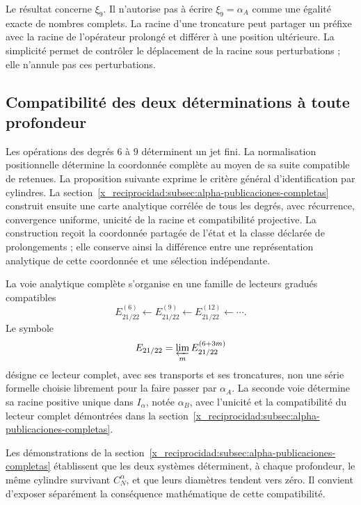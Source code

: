 Le résultat concerne \(\xi_9\). Il n'autorise pas à écrire \(\xi_9=\alpha_A\) comme une égalité exacte de nombres complets. La racine d'une troncature peut partager un préfixe avec la racine de l'opérateur prolongé et différer à une position ultérieure. La simplicité permet de contrôler le déplacement de la racine sous perturbations ; elle n'annule pas ces perturbations.

\subsection{Compatibilité des deux déterminations à toute profondeur}
\label{x_reciprocidad:subsec:alpha-limite-dos-vias}

\begin{remark}
Les opérations des degrés \(6\) à \(9\) déterminent un jet fini. La normalisation positionnelle détermine la coordonnée complète au moyen de sa suite compatible de retenues. La proposition suivante exprime le critère général d'identification par cylindres. La section~\ref{x_reciprocidad:subsec:alpha-publicaciones-completas} construit ensuite une carte analytique corrélée de tous les degrés, avec récurrence, convergence uniforme, unicité de la racine et compatibilité projective. La construction reçoit la coordonnée partagée de l'état et la classe déclarée de prolongements ; elle conserve ainsi la différence entre une représentation analytique de cette coordonnée et une sélection indépendante.
\end{remark}

La voie analytique complète s’organise en une famille de lecteurs
gradués compatibles
\[
 E_{21/22}^{(6)}\longleftarrow E_{21/22}^{(9)}
 \longleftarrow E_{21/22}^{(12)}\longleftarrow\cdots.
\]
Le symbole
\[
 E_{21/22}=\varprojlim_m E_{21/22}^{(6+3m)}
\]
désigne ce lecteur complet, avec ses transports et ses troncatures, non une
série formelle choisie librement pour la faire passer par \(\alpha_A\).
La seconde voie détermine sa racine positive unique dans \(I_\alpha\),
notée \(\alpha_B\), avec l’unicité et la compatibilité du
lecteur complet démontrées dans la section~\ref{x_reciprocidad:subsec:alpha-publicaciones-completas}.

Les démonstrations de la section~\ref{x_reciprocidad:subsec:alpha-publicaciones-completas}
établissent que les deux systèmes déterminent, à chaque profondeur, le même
cylindre survivant \(C_N^\alpha\), et que leurs diamètres tendent vers
zéro. Il convient d’exposer séparément la conséquence mathématique de cette
compatibilité.

